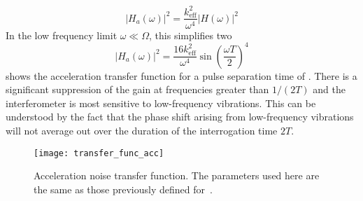 \begin{equation}
  |H_a(\omega)|^2 = \frac{k_\text{eff}^2}{\omega^4}|H(\omega)|^2 
  \label{eq:acc_transfer}
\end{equation}
In the low frequency limit \(\omega \ll \Omega\), this simplifies two
\begin{equation}
  |H_a(\omega)|^2 = \frac{16 k_\text{eff}^2}{\omega^4}
  \sin\left(\frac{\omega T}{2}\right)^4
  \label{eq:acc_tf_low}
\end{equation}
shows the acceleration transfer function for a pulse separation time
of . There is a significant suppression of the gain
at frequencies greater than $1/(2T)$ and the interferometer is most
sensitive to low-frequency vibrations. This can be understood by the
fact that the phase shift arising from
low-frequency vibrations will not average out over the duration of the
interrogation time $2T$.  
\begin{figure}[htpb]
  \centering
  \texttt{[image: transfer\_func\_acc]}
  \caption[Acceleration noise transfer function.]{Acceleration noise
  transfer function. The parameters used here are the same as those
previously defined for~.}
  \label{fig:transfer_func_acc}
\end{figure}
